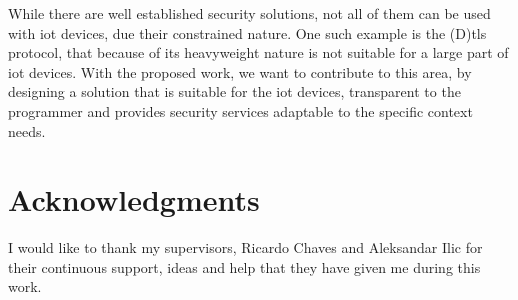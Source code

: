 \documentclass[conference]{IEEEtran}
\begin{document}
While there are well established security solutions, not all of them can be used
with \gls{iot} devices, due their constrained nature. One such example is
the (D)\gls{tls} protocol, that because of its heavyweight nature is not suitable for a large part of \gls{iot} devices. With the proposed work,
we want to contribute to this area, by designing a solution that is suitable for the \gls{iot} devices, transparent
to the programmer and provides security services adaptable to the specific context needs.

\section*{Acknowledgments}

I would like to thank my supervisors, Ricardo Chaves and Aleksandar Ilic for
their continuous support, ideas and help that they have given me during
this work.



\end{document}

